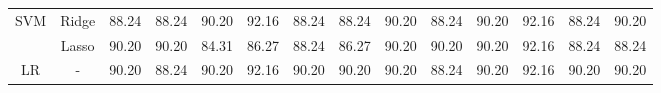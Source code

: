 \begin{landscape}
\begin{table}[]
{\begin{tabular}{cc|cccccccccccc}
				\multirow{2}{*}{SVM}            & Ridge                                 & 88.24                                                             & 88.24                                                                & 90.20                                                                & 92.16                                                               & 88.24                                                            & \multicolumn{1}{c|}{88.24}                                                                   & 90.20                                                             & 88.24                                                                & 90.20                                                                & 92.16                                                               & 88.24                                                            & 90.20                                                                   \\
				& Lasso                                 & 90.20                                                             & 90.20                                                                & 84.31                                                                & 86.27                                                               & 88.24                                                            & \multicolumn{1}{c|}{86.27}                                                                   & 90.20                                                             & 90.20                                                                & 90.20                                                                & 92.16                                                               & 88.24                                                            & 88.24                                                                   \\ \hline
				\multirow{3}{*}{LR}             & -                                     & 90.20                                                             & 88.24                                                                & 90.20                                                                & 92.16                                                               & 90.20                                                            & \multicolumn{1}{c|}{90.20}                                                                   & 90.20                                                             & 88.24                                                                & 90.20                                                                & 92.16                                                               & 90.20                                                            & 90.20                                                                   \\

\end{tabular}}
\end{table}
\end{landscape}

